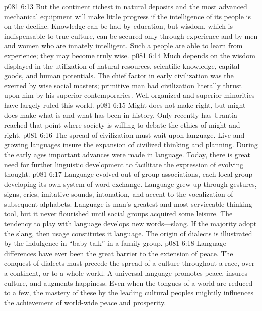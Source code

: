 \vs p081 6:13 But the continent richest in natural deposits and the most advanced mechanical equipment will make little progress if the intelligence of its people is on the decline. Knowledge can be had by education, but wisdom, which is indispensable to true culture, can be secured only through experience and by men and women who are innately intelligent. Such a people are able to learn from experience; they may become truly wise.
\pc \vs p081 6:14 \bibnobreakspace {} Much depends on the wisdom displayed in the utilization of natural resources, scientific knowledge, capital goods, and human potentials. The chief factor in early civilization was the  exerted by wise social masters; primitive man had civilization literally thrust upon him by his superior contemporaries. Well\hyp{}organized and superior minorities have largely ruled this world.
\vs p081 6:15 Might does not make right, but might does make what is and what has been in history. Only recently has Urantia reached that point where society is willing to debate the ethics of might and right.
\pc \vs p081 6:16 \bibnobreakspace {} The spread of civilization must wait upon language. Live and growing languages insure the expansion of civilized thinking and planning. During the early ages important advances were made in language. Today, there is great need for further linguistic development to facilitate the expression of evolving thought.
\vs p081 6:17 Language evolved out of group associations, each local group developing its own system of word exchange. Language grew up through gestures, signs, cries, imitative sounds, intonation, and accent to the vocalization of subsequent alphabets. Language is man’s greatest and most serviceable thinking tool, but it never flourished until social groups acquired some leisure. The tendency to play with language develops new words---slang. If the majority adopt the slang, then usage constitutes it language. The origin of dialects is illustrated by the indulgence in “baby talk” in a family group.
\vs p081 6:18 Language differences have ever been the great barrier to the extension of peace. The conquest of dialects must precede the spread of a culture throughout a race, over a continent, or to a whole world. A universal language promotes peace, insures culture, and augments happiness. Even when the tongues of a world are reduced to a few, the mastery of these by the leading cultural peoples mightily influences the achievement of world\hyp{}wide peace and prosperity.
